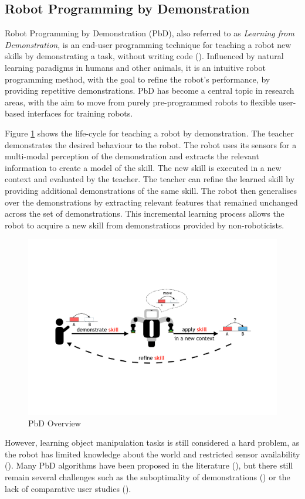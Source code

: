 \subsection{Robot Programming by Demonstration}
Robot Programming by Demonstration (PbD), also referred to as \textit{Learning from Demonstration}, is an end-user programming technique for teaching a robot new skills by demonstrating a task, without writing code (\cite{billard2008robot}).
Influenced by natural learning paradigms in humans and other animals, it is an intuitive robot programming method, with the goal to refine the robot's performance, by providing repetitive demonstrations.
PbD has become a central topic in research areas, with the aim to move from purely pre-programmed robots to flexible user-based interfaces for training robots.

Figure \ref{fig:Principle Overview} shows the life-cycle for teaching a robot by demonstration.
The teacher demonstrates the desired behaviour to the robot.
The robot uses its sensors for a multi-modal perception of the demonstration and extracts the relevant information to create a model of the skill.
The new skill is executed in a new context and evaluated by the teacher.
The teacher can refine the learned skill by providing additional demonstrations of the same skill.
The robot then generalises over the demonstrations by extracting relevant features that remained unchanged across the set of demonstrations.
This incremental learning process allows the robot to acquire a new skill from demonstrations provided by non-roboticists.

\begin{figure}[h]
	\centering
	\includegraphics[width=0.7\linewidth]{figures/PbD-Overview}
	\caption{PbD Overview}
	\label{fig:Principle Overview}
\end{figure}

However, learning object manipulation tasks is still considered a hard problem, as the robot has limited knowledge about the world and restricted sensor availability (\cite{ekvall2008robot}).
Many PbD algorithms have been proposed in the literature (\cite{argall2009survey,billing2010formalism}), but there still remain several challenges such as the suboptimality of demonstrations (\cite{chen2003programing,kaiser1995obtaining}) or the lack of comparative user studies (\cite{suay2012practical}).

